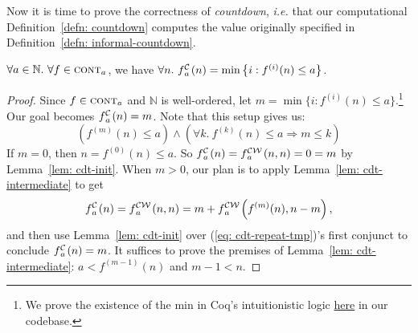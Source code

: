 Now it is time to prove the correctness of \emph{countdown}, \emph{i.e.} that our computational Definition~\ref{defn: countdown} computes the value originally specified in Definition~\ref{defn: informal-countdown}.
\begin{thm} \label{thm: cdt-repeat}
	$\forall a \in \mathbb{N}.~ \forall f\in \text{\scshape{cont}}_{a}$, we have 
$	\forall n.~ \cdt{f}{a}(n) = \min\left\{ i : f^{(i)}(n) \le a \right\} $.
\end{thm}
\begin{proof}
Since $f\in \text{\scshape{cont}}_{a}$ and $\mathbb{N}$ is well-ordered, 
let $m = \min\big\{i : f^{(i)}(n)\le a\big\}$.\footnote{We prove the existence 
of the min in Coq’s intuitionistic logic \href{https://github.com/inv-ack/inv-ack/blob/6099297c6ab0e16d14b037fb5ed600c4d22818f6/countdown.v\#L125-L150}{here} in our codebase.} Our goal becomes 
$\cdt{f}{a}(n) = m$. Note that this setup gives us: 
	\begin{equation}
	\left(f^{(m)}(n) \le a\right) \label{eq: cdt-repeat-tmp} \wedge
	 \left(\forall k.~f^{(k)}(n)\le a \Rightarrow m \le k\right)
	\end{equation}
If $m = 0$, then $n = f^{(0)}(n)\le a$. So $\cdt{f}{a}(n) = \cdw{f}{a}(n, n) = 0 = m$ by Lemma~\ref{lem: cdt-init}.
When $m > 0$, our plan is to apply Lemma~\ref{lem: cdt-intermediate} to get
	\begin{equation*}
	\cdt{f}{a}(n) = \cdw{f}{a}(n, n) = m + \cdw{f}{a}\left(f^{(m)}(n), n-m\right),
	\end{equation*}
and then use Lemma~\ref{lem: cdt-init} over (\ref{eq: cdt-repeat-tmp})'s first conjunct to conclude $\cdt{f}{a}(n) = m$. It suffices to prove the premises of Lemma~\ref{lem: cdt-intermediate}: $a < f^{(m-1)}(n)$ and $m-1 < n$.
	

\end{proof}
